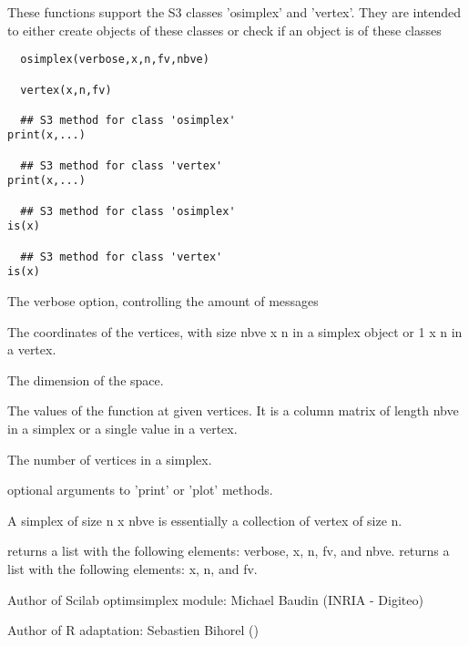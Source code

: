 %
\begin{Description}\relax
These functions support the S3 classes 'osimplex' and 'vertex'. They are 
intended to either create objects of these classes or check if an object is 
of these classes
\end{Description}
%
\begin{Usage}
\begin{verbatim}
  osimplex(verbose,x,n,fv,nbve)
  
  vertex(x,n,fv)
  
  ## S3 method for class 'osimplex'
print(x,...)
  
  ## S3 method for class 'vertex'
print(x,...)
  
  ## S3 method for class 'osimplex'
is(x)
  
  ## S3 method for class 'vertex'
is(x)
\end{verbatim}
\end{Usage}
%
\begin{Arguments}
\begin{ldescription}
\item[\code{verbose}] The verbose option, controlling the amount of messages
\item[\code{x}] The coordinates of the vertices, with size nbve x n in a simplex 
object or 1 x n in a vertex.
\item[\code{n}] The dimension of the space.
\item[\code{fv}] The values of the function at given vertices. It is a column
matrix of length nbve in a simplex or a single value in a vertex.
\item[\code{nbve}] The number of vertices in a simplex.
\item[\code{...}] optional arguments to 'print' or 'plot' methods.
\end{ldescription}
\end{Arguments}
%
\begin{Details}\relax
A simplex of size n x nbve is essentially a collection of vertex of size n. 
\end{Details}
%
\begin{Value}
 returns a list with the following elements: verbose, x, n, fv, 
and nbve.
 returns a list with the following elements: x, n, and fv.
\end{Value}
%
\begin{Author}\relax
Author of Scilab optimsimplex module: Michael Baudin (INRIA - Digiteo)

Author of R adaptation: Sebastien Bihorel ()
\end{Author}
